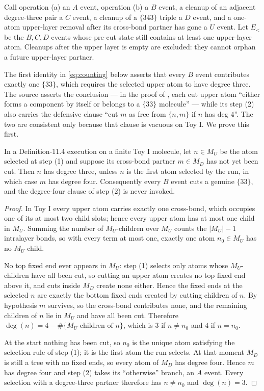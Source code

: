 \documentclass[12pt]{article}
\newcommand{\MU}{M_U}
\newcommand{\MD}{M_D}
\begin{document}
Call operation (a) an \(A\) event, operation (b) a \(B\) event, a cleanup of an
adjacent degree-three pair a \(C\) event, a cleanup of a \(\{343\}\) triple a
\(D\) event, and a one-atom upper-layer removal after its cross-bond partner
has gone a \(U\) event.  Let \(E_<\) be the \(B,C,D\) events whose pre-cut state
still contains at least one upper-layer atom.  Cleanups after the upper layer
is empty are excluded: they cannot orphan a future upper-layer partner.

The first identity in \eqref{eq:counting} below asserts that every \(B\) event
contributes exactly one \(\{33\}\), which requires the selected upper atom to
have degree three.  The source asserts the conclusion --- in the proof of
\cite[Proposition 11.7]{DHM}, each cut upper atom ``either forms a component by
itself or belongs to a \(\{33\}\) molecule'' --- while its step (2) also carries
the defensive clause ``cut \(m\) as free from \(\{n,m\}\) if \(n\) has deg
\(4\)''.  The two are consistent only because that clause is vacuous on Toy I.
We prove this first.

\begin{lemma}\label{lem:degree}
In a Definition-11.4 execution on a finite Toy I molecule, let \(n\in\MU\) be
the atom selected at step (1) and suppose its cross-bond partner \(m\in\MD\)
has not yet been cut.  Then \(n\) has degree three, unless \(n\) is the first
atom selected by the run, in which case \(m\) has degree four.  Consequently
every \(B\) event cuts a genuine \(\{33\}\), and the degree-four clause of step
(2) is never invoked.
\end{lemma}

\begin{proof}
In Toy I every upper atom carries exactly one cross-bond, which occupies one of
its at most two child slots; hence every upper atom has at most one child in
\(\MU\).  Summing the number of \(\MU\)-children over \(\MU\) counts the
\(|\MU|-1\) intralayer bonds, so with every term at most one, exactly one atom
\(n_0\in\MU\) has no \(\MU\)-child.

No top fixed end ever appears in \(\MU\): step (1) selects only atoms whose
\(\MU\)-children have all been cut, so cutting an upper atom creates no top
fixed end above it, and cuts inside \(\MD\) create none either.  Hence the fixed
ends at the selected \(n\) are exactly the bottom fixed ends created by cutting
children of \(n\).  By hypothesis \(m\) survives, so the cross-bond contributes
none, and the remaining children of \(n\) lie in \(\MU\) and have all been cut.
Therefore \(\deg(n)=4-\#\{\MU\text{-children of }n\}\), which is \(3\) if
\(n\neq n_0\) and \(4\) if \(n=n_0\).

At the start nothing has been cut, so \(n_0\) is the unique atom satisfying the
selection rule of step (1); it is the first atom the run selects.  At that
moment \(\MD\) is still a tree with no fixed ends, so every atom of \(\MD\) has
degree four.  Hence \(m\) has degree four and step (2) takes its ``otherwise''
branch, an \(A\) event.  Every selection with a degree-three partner therefore
has \(n\neq n_0\) and \(\deg(n)=3\).
\end{proof}
\end{document}

